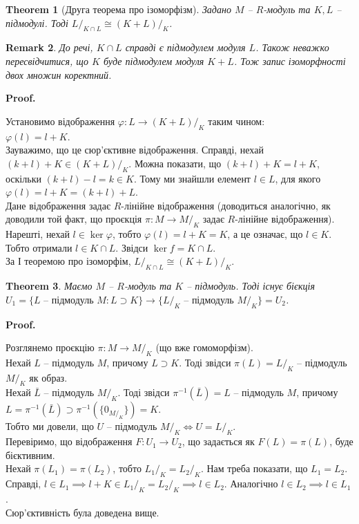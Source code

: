 \documentclass[a4paper, 10pt]{article}
\makeatletter
\theoremstyle{theoremdd}
\newtheorem{theorem}{Theorem}[subsection]
\theoremstyle{theoremdd}
\theoremstyle{theoremdd}
\theoremstyle{theoremdd}
\theoremstyle{theoremdd}
\theoremstyle{theoremdd}
\theoremstyle{theoremdd}
\theoremstyle{theoremdd}
\theoremstyle{theoremdd}
\theoremstyle{theoremdd}
\theoremstyle{theoremdd}
\newtheorem{remark}[theorem]{Remark}
\theoremstyle{theoremdd}
\theoremstyle{theoremdd}
\theoremstyle{theoremdd}
\theoremstyle{theoremdd}
\renewenvironment{proof}[1][Proof.\\]{\par
\pushQED{\hfill \qed}%
\normalfont \topsep6\p@\@plus6\p@\relax
\trivlist
\item\relax
{\bfseries
#1\@addpunct{.}}\hspace\labelsep\ignorespaces
}{%
\popQED\endtrivlist\@endpefalse
}
\makeatother
\begin{document}
\begin{theorem}[Друга теорема про ізоморфізм]
Задано $M$ -- $R$-модуль та $K,L$ -- підмодулі. Тоді $L/_{K \cap L} \cong (K + L)/_K$.
\end{theorem}

\begin{remark}
До речі, $K \cap L$ справді є підмодулем модуля $L$. Також неважко пересвідчитися, що $K$ буде підмодулем модуля $K+L$. Тож запис ізоморфності двох множин коректний.
\end{remark}

\begin{proof}
Установимо відображення $\varphi \colon L \to (K+L)/_K$ таким чином:\\
$\varphi(l) = l+K$.\\
Зауважимо, що це сюр'єктивне відображення. Справді, нехай $(k+l) + K \in (K+L)/_K$. Можна показати, що $(k+l) + K = l+K$, оскільки $(k+l) - l = k \in K$. Тому ми знайшли елемент $l \in L$, для якого $\varphi(l) = l+K = (k+l) + L$.\\
Дане відображення задає $R$-лінійне відображення (доводиться аналогічно, як доводили той факт, що проєкція $\pi \colon M \to M/_K$ задає $R$-лінійне відображення).\\
Нарешті, нехай $l \in \ker \varphi$, тобто $\varphi(l) = l + K = K$, а це означає, що $l \in K$. Тобто отримали $l \in K \cap L$. Звідси $\ker f = K \cap L$.\\
За І теоремою про ізоморфім, $L/_{K \cap L} \cong (K + L)/_K$.
\end{proof}

\begin{theorem}
Маємо $M$ -- $R$-модуль та $K$ -- підмодуль. Тоді існує бієкція $U_1 = \{ L \text{ -- підмодуль } M: L \supset K \} \to \{ L/_K \text{ -- підмодуль } M/_K \} = U_2$.
\end{theorem}

\begin{proof}
Розглянемо проєкцію $\pi \colon M \to M/_K$ (що вже гомоморфізм).\\
Нехай $L$ -- підмодуль $M$, причому $L \supset K$. Тоді звідси $\pi(L) = L/_K$ -- підмодуль $M/_K$ як образ.\\
Нехай $\bar{L}$ -- підмодуль $M/_K$. Тоді звідси $\pi^{-1}(\bar{L}) = L$ -- підмодуль $M$, причому $L = \pi^{-1}(\bar{L}) \supset \pi^{-1}(\{0_{M/_K}\}) = K$. 
\bigskip \\
Тобто ми довели, що $U$ -- підмодуль $M/_K \iff U = L/_K$.\\
Перевіримо, що відображення $F \colon U_1 \to U_2$, що задається як $F(L) = \pi(L)$, буде бієктивним.\\
Нехай $\pi(L_1) = \pi(L_2)$, тобто ${L_1}/_K = {L_2}/_K$. Нам треба показати, що $L_1 = L_2$. Справді, $l \in L_1 \implies l+K \in {L_1}/_K = {L_2}/_K \implies l \in L_2$. Аналогічно $l \in L_2 \implies l \in L_1$.\\
Сюр'єктивність була доведена вище.
\end{proof}
\end{document}
